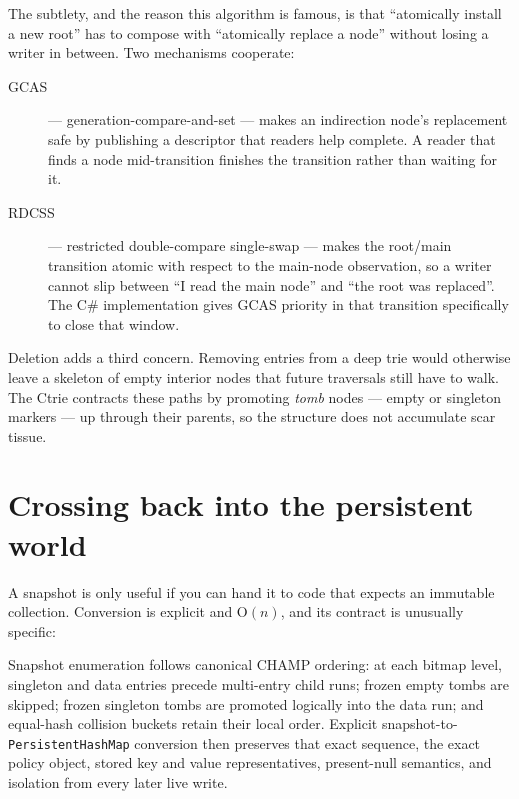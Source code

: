 \documentclass[11pt,twoside,openright]{book}
\newcommand{\code}[1]{\texorpdfstring{\textcolor{d7ink}{\texttt{#1}}}{#1}}
\newcommand{\term}[1]{\textit{#1}}
\newcommand{\bigoh}[1]{$\mathrm{O}(#1)$}
\begin{document}
The subtlety, and the reason this algorithm is famous, is that ``atomically
install a new root'' has to compose with ``atomically replace a node'' without
losing a writer in between. Two mechanisms cooperate:

\begin{description}
\item[GCAS] --- generation-compare-and-set --- makes an indirection node's
replacement safe by publishing a descriptor that readers help complete. A reader
that finds a node mid-transition finishes the transition rather than waiting for
it.
\item[RDCSS] --- restricted double-compare single-swap --- makes the root/main
transition atomic with respect to the main-node observation, so a writer cannot
slip between ``I read the main node'' and ``the root was replaced''. The C\#
implementation gives GCAS priority in that transition specifically to close
that window.
\end{description}

Deletion adds a third concern. Removing entries from a deep trie would otherwise
leave a skeleton of empty interior nodes that future traversals still have to
walk. The Ctrie contracts these paths by promoting \term{tomb} nodes --- empty
or singleton markers --- up through their parents, so the structure does not
accumulate scar tissue.

\section{Crossing back into the persistent world}

A snapshot is only useful if you can hand it to code that expects an immutable
collection. Conversion is explicit and \bigoh{n}, and its contract is unusually
specific:

\begin{contractbox}
Snapshot enumeration follows canonical CHAMP ordering: at each bitmap level,
singleton and data entries precede multi-entry child runs; frozen empty tombs
are skipped; frozen singleton tombs are promoted logically into the data run;
and equal-hash collision buckets retain their local order. Explicit
snapshot-to-\code{PersistentHashMap} conversion then preserves that exact
sequence, the exact policy object, stored key and value representatives,
present-null semantics, and isolation from every later live write.
\end{contractbox}
\end{document}

